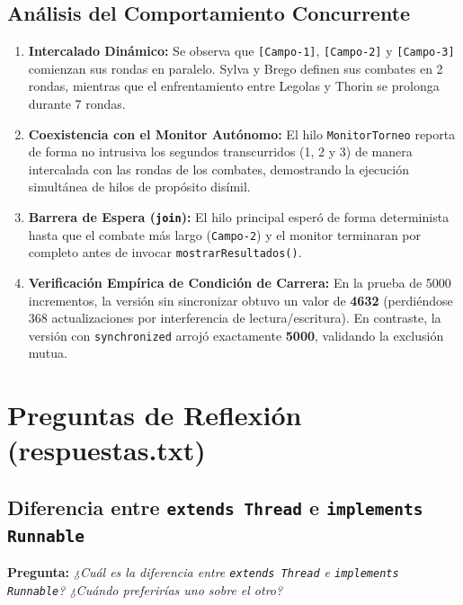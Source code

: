 \documentclass[11pt,letterpaper]{article}
\begin{document}
\subsection{Análisis del Comportamiento Concurrente}
\begin{enumerate}
    \item \textbf{Intercalado Dinámico:} Se observa que \texttt{[Campo-1]}, \texttt{[Campo-2]} y \texttt{[Campo-3]} comienzan sus rondas en paralelo. Sylva y Brego definen sus combates en 2 rondas, mientras que el enfrentamiento entre Legolas y Thorin se prolonga durante 7 rondas.
    \item \textbf{Coexistencia con el Monitor Autónomo:} El hilo \texttt{MonitorTorneo} reporta de forma no intrusiva los segundos transcurridos (1, 2 y 3) de manera intercalada con las rondas de los combates, demostrando la ejecución simultánea de hilos de propósito disímil.
    \item \textbf{Barrera de Espera (\texttt{join}):} El hilo principal esperó de forma determinista hasta que el combate más largo (\texttt{Campo-2}) y el monitor terminaran por completo antes de invocar \texttt{mostrarResultados()}.
    \item \textbf{Verificación Empírica de Condición de Carrera:} En la prueba de 5000 incrementos, la versión sin sincronizar obtuvo un valor de \textbf{4632} (perdiéndose 368 actualizaciones por interferencia de lectura/escritura). En contraste, la versión con \texttt{synchronized} arrojó exactamente \textbf{5000}, validando la exclusión mutua.
\end{enumerate}

\section{Preguntas de Reflexión (respuestas.txt)}

\subsection{Diferencia entre \texttt{extends Thread} e \texttt{implements Runnable}}
\textbf{Pregunta:} \textit{¿Cuál es la diferencia entre \texttt{extends Thread} e \texttt{implements Runnable}? ¿Cuándo preferirías uno sobre el otro?}
\end{document}
